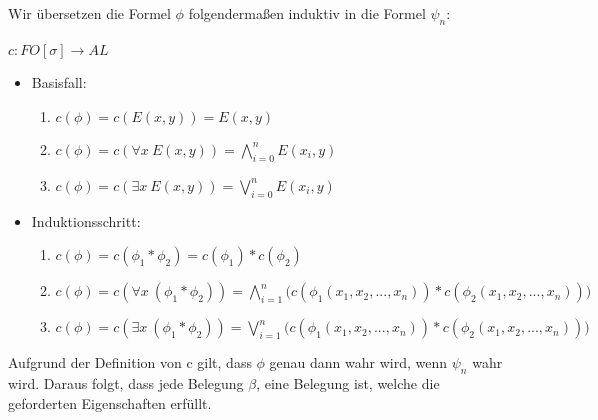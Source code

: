 \documentclass[a4paper,10pt]{article}
\begin{document}
Wir übersetzen die Formel $\phi$ folgendermaßen induktiv in die Formel $\psi_n$: \\
\ \\
$c: FO[\sigma] \rightarrow AL$ 
\begin{itemize}
	\item 	Basisfall: 
		\begin{enumerate}
		\setlength{\itemindent}{2em}
		\item  $c(\phi) = c(E(x,y)) = E(x,y)$
		\item  $c(\phi) = c(\forall x~ E(x,y)) = \bigwedge\limits_{i = 0}^n E(x_i,y)$ 
		\item  $c(\phi) = c(\exists x~ E(x,y)) = \bigvee\limits_{i = 0}^n E(x_i,y)$
		\end{enumerate}
	\item 	Induktionsschritt: 
		\begin{enumerate}
		\setlength{\itemindent}{2em}
		\item  $c(\phi) = c(\phi_1 * \phi_2) = c(\phi_1) * c(\phi_2)$ 
		\item  $c(\phi) = c(\forall x~(\phi_1 * \phi_2)) = 
		\bigwedge\limits_{i = 1}^n \Big( c(\phi_1(x_1,x_2,...,x_n)) * c(\phi_2(x_1,x_2,...,x_n)) \Big)$ 
		\item  $c(\phi) = c(\exists x~(\phi_1 * \phi_2)) = 
		\bigvee\limits_{i = 1}^n \Big( c(\phi_1(x_1,x_2,...,x_n)) * c(\phi_2(x_1,x_2,...,x_n)) \Big)$
		\end{enumerate}
\end{itemize}

Aufgrund der Definition von c gilt, dass $\phi$ genau dann wahr wird, wenn $\psi_n$ wahr wird. Daraus folgt, dass jede Belegung $\beta$, 
eine Belegung ist, welche die geforderten Eigenschaften erfüllt.
\end{document}
